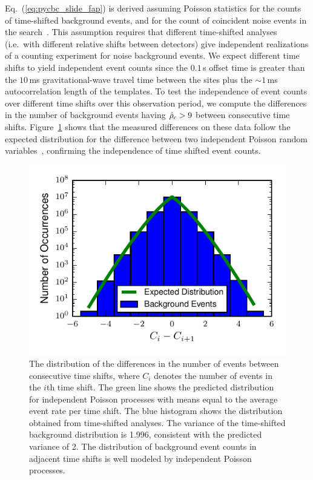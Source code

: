 Eq.~(\ref{eq:pycbc_slide_fap}) is derived assuming Poisson statistics for the
counts of time-shifted background events, and for the count of coincident
noise events in the search~\cite{Usman:2015kfa, Capano:2016uif}.  This
assumption requires that different time-shifted analyses (i.e.\ with different
relative shifts between detectors) give independent realizations of a counting
experiment for noise background events. We expect different time shifts to
yield independent event counts since the $0.1$\,s offset time is greater than
the $10$\,ms gravitational-wave travel time between the sites plus the $\sim
1$\,ms autocorrelation length of the templates. To test the independence of
event counts over different time shifts over this observation period, we
compute the differences in the number of background events having $\hat{\rho}_c >
9$ between consecutive time shifts.  Figure~\ref{fig:slide_corr} shows that the
measured differences on these data follow the expected distribution for the
difference between two independent Poisson random
variables~\cite{Skellam:1946}, confirming the independence of time shifted
event counts. 
\begin{figure}[!t]
\hspace*{-0.1in}
\includegraphics[width=\textwidth]{figs/chapter2/slide_corr.pdf}
\caption{\label{fig:slide_corr} 
The distribution of the differences in the number of events between 
consecutive time shifts, where $C_i$ denotes the number of events in the 
$i$th time shift.
The green line shows the predicted distribution for independent Poisson
processes with means equal to the average event rate per time shift. 
The blue histogram shows the distribution obtained from time-shifted 
analyses.  The variance of the time-shifted background distribution is 
1.996, consistent with the predicted variance of 2. The distribution 
of background event counts in adjacent time shifts is well modeled by 
independent Poisson processes.}
\end{figure}

